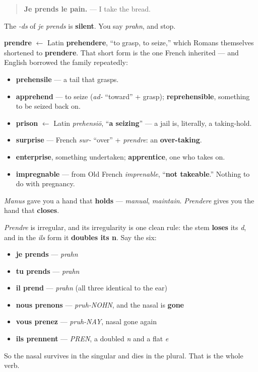 \begin{quote}
\textbf{Je prends le pain.} — I take the bread.
\end{quote}

The \emph{-ds} of \emph{je prends} is \textbf{silent}. You say \emph{prahn}, and stop.

\begin{cousinweb}
\textbf{prendre} $\leftarrow$ Latin \textbf{prehendere}, \textquotedblleft{}to grasp, to seize,\textquotedblright{} which Romans themselves shortened to \textbf{prendere}. That short form is the one French inherited — and English borrowed the family repeatedly:

\begin{itemize}
\raggedright
  \item \textbf{prehensile} — a tail that grasps.
  \item \textbf{apprehend} — to seize (\emph{ad-} \textquotedblleft{}toward\textquotedblright{} + grasp); \textbf{reprehensible}, something to be seized back on.
  \item \textbf{prison} $\leftarrow$ Latin \emph{prehensiō}, \textquotedblleft{}\textbf{a seizing}\textquotedblright{} — a jail is, literally, a taking-hold.
  \item \textbf{surprise} — French \emph{sur-} \textquotedblleft{}over\textquotedblright{} + \emph{prendre}: an \textbf{over-taking}.
  \item \textbf{enterprise}, something undertaken; \textbf{apprentice}, one who takes on.
  \item \textbf{impregnable} — from Old French \emph{imprenable}, \textquotedblleft{}\textbf{not takeable}.\textquotedblright{} Nothing to do with pregnancy.
\end{itemize}

\emph{Manus} gave you a hand that \textbf{holds} — \emph{manual}, \emph{maintain}. \emph{Prendere} gives you the hand that \textbf{closes}.
\end{cousinweb}

\begin{grammarlens}[title={Grammar Lens: the stem that doubles}]
\emph{Prendre} is irregular, and its irregularity is one clean rule: the stem \textbf{loses} its \emph{d}, and in the \emph{ils} form it \textbf{doubles its n}. Say the six:

\begin{itemize}
\raggedright
  \item \textbf{je prends} — \emph{prahn}
  \item \textbf{tu prends} — \emph{prahn}
  \item \textbf{il prend} — \emph{prahn} (all three identical to the ear)
  \item \textbf{nous prenons} — \emph{pruh-NOHN}, and the nasal is \textbf{gone}
  \item \textbf{vous prenez} — \emph{pruh-NAY}, nasal gone again
  \item \textbf{ils prennent} — \emph{PREN}, a doubled \emph{n} and a flat \emph{e}
\end{itemize}

So the nasal survives in the singular and dies in the plural. That is the whole verb.
\end{grammarlens}


